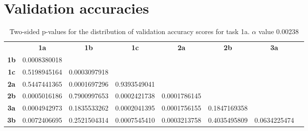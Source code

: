 \section{Validation accuracies}
\label{appendix:ptable.accuracy}

\begin{table}[h!]
    \centering
    \begin{tabular}{cccccccc}
                              & \textbf{1a}        & \textbf{1b}        & \textbf{1c}        & \textbf{2a}        & \textbf{2b}  & \textbf{3a}  \\
    \textbf{1b}               & 0.0008380018       &                    &                    &                    &              &              \\
    \textbf{1c}               & 0.5198945164       & 0.0003097918       &                    &                    &              &              \\
    \textbf{2a}               & 0.5447441365       & 0.0001697296       & 0.9393549041       &                    &              &              \\
    \textbf{2b}               & 0.0005016186       & 0.7900997653       & 0.0002421738       &  0.0001786145      &              &              \\
    \textbf{3a}               & 0.0004942973       & 0.1835533262       & 0.0002041395       &  0.0001756155      & 0.1847169358 &              \\
    \textbf{3b}               & 0.0072406695       & 0.2521504314       & 0.0007545410       &  0.0003213758      & 0.4035495809 & 0.0634225474 
    \end{tabular}
    \caption[p-table for validation accuracy (task 1a)]{Two-sided p-values for the distribution of validation accuracy scores for task 1a. \(\alpha\) value 0.00238}
    \label{tab:exp2.validation1a}
\end{table}

